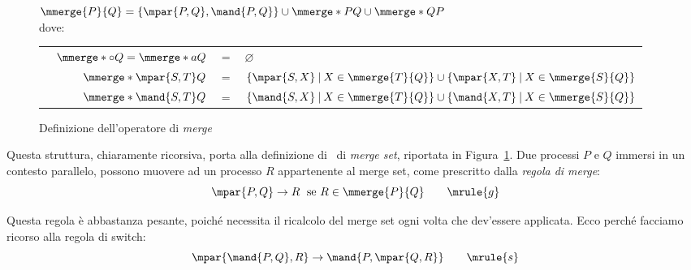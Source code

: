 \documentclass[12pt,a4paper,openright,twoside]{report}
\begin{document}
\begin{figure}[t!]
\vspace{.7em}
\begin{minipage}[t]{.7\textwidth}\end{minipage}
\begin{minipage}[t]{.93\textwidth}
$\mmerge{P}{Q} = \{ \mpar{P, Q}, \mand{P, Q} \} \cup \mmerge*{P}{Q} \cup \mmerge*{Q}{P}$ \
\vspace{.6em} \\
dove: \
\vspace{.4em} \\
\begin{tabular}{lrcl}
	& $\mmerge*{\circ}{Q} = \mmerge*{a}{Q}$ & $=$ & $\varnothing$ \\
	& $\mmerge*{\mpar{S, T}}{Q}$ & $=$ & $\{ \mpar{S, X} \:|\: X \in \mmerge{T}{Q} \} \cup \{ \mpar{X, T} \:|\: X \in \mmerge{S}{Q} \}$ \\
	& $\mmerge*{\mand{S, T}}{Q}$ & $=$ & $\{ \mand{S, X} \:|\: X \in \mmerge{T}{Q} \} \cup \{ \mand{X, T} \:|\: X \in \mmerge{S}{Q} \}$
\end{tabular}
\end{minipage}
\vspace{.4em}
\caption{Definizione dell'operatore di \emph{merge}}
\label{fig:merge}
\end{figure}

Questa struttura, chiaramente ricorsiva, porta alla definizione di~\cite{Gug02} di \emph{merge set}, riportata in Figura~\ref{fig:merge}. Due processi $P$ e $Q$ immersi in un contesto parallelo, possono muovere ad un processo $R$ appartenente al merge set, come prescritto dalla \emph{regola di merge}:
$$
	\mpar{P, Q} \rightarrow R \;\mbox{ se } R \in \mmerge{P}{Q} \qquad \mrule{g}
$$

Questa regola \`e abbastanza pesante, poich\'e necessita il ricalcolo del merge set ogni volta che dev'essere applicata. Ecco perch\'e facciamo ricorso alla regola di switch:
$$
	\mpar{\mand{P, Q}, R} \rightarrow \mand{P, \mpar{Q, R}} \qquad \mrule{s}
$$
\end{document}
